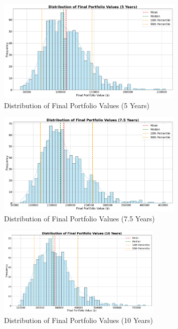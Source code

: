 \begin{figure}[!htbp]
    \centering
    \includegraphics[width=0.8\textwidth]{../Figures/final_portfolio_values_distribution_5_years.png}
    \caption{Distribution of Final Portfolio Values (5 Years)}
    \label{fig:final_portfolio_values_5y}
\end{figure}
\FloatBarrier

\begin{figure}[!htbp]
    \centering
    \includegraphics[width=0.8\textwidth]{../Figures/final_portfolio_values_distribution_7_5_years.png}
    \caption{Distribution of Final Portfolio Values (7.5 Years)}
    \label{fig:final_portfolio_values_7_5y}
\end{figure}
\FloatBarrier

\begin{figure}[!htbp]
    \centering
    \includegraphics[width=0.7\textwidth]{../Figures/final_portfolio_values_distribution_10_years.png}
    \caption{Distribution of Final Portfolio Values (10 Years)}
    \label{fig:final_portfolio_values_10y}
\end{figure}
\FloatBarrier

